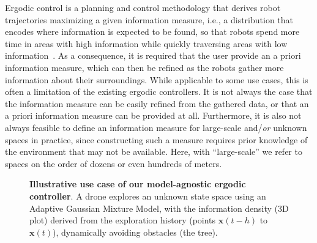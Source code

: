 \documentclass[letterpaper, 10 pt, conference, twoside]{IEEEtran}
\theoremstyle{definition}
\begin{document}
Ergodic control is a planning and control methodology that derives robot trajectories maximizing a given information measure, i.e., a distribution that encodes where information is expected to be found, so that robots spend more time in areas with high information while quickly traversing areas with low information~\cite{mathew2011metrics,abraham2017ergodic,miller2013trajectory}. %
As a consequence, it is required that the user provide an a priori information measure, which can then be refined as the robots gather more information about their surroundings. 
While applicable to some use cases, this is often a limitation of the existing ergodic controllers. It is not always the case that the information measure can be easily refined from the gathered data, or that an a priori information measure can be provided at all. 
Furthermore, it is also not always feasible to define an information measure for large-scale and/\textit{or} unknown spaces in practice, since constructing such a measure requires prior knowledge of the environment that may not be available. Here, with ``large-scale'' we refer to spaces on the order of dozens or even hundreds of meters.

\begin{figure}
  \centering
  
  \caption{\textbf{Illustrative use case of our model-agnostic ergodic controller}. A drone explores an unknown state space using an Adaptive Gaussian Mixture Model, with the information density (3D plot) derived from the exploration history (points $\mathbf{x}(t-h)$ to $\mathbf{x}(t)$), dynamically avoiding obstacles (the tree).}
  \label{fig:-1}
  \vspace*{-.1cm}
\end{figure}
\end{document}
